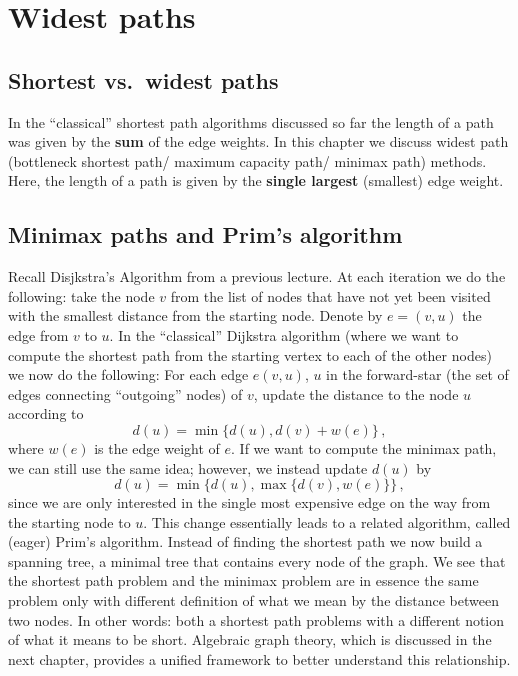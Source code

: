 \chapter{Widest paths}%
\label{chap:08}

\setcounter{section}{1}
\section{Shortest vs.\ widest paths}
In the ``classical'' shortest path algorithms discussed so far the
length of a path was given by the \textbf{sum} of the edge weights. In
this chapter we discuss widest path (bottleneck shortest path/ maximum
capacity path/ minimax path) methods.  Here, the length of a path is
given by the \textbf{single largest} (smallest) edge weight.

\section{Minimax paths and Prim's algorithm}
Recall Disjkstra's Algorithm from a previous lecture. At each
iteration we do the following: take the node $v$ from the list of
nodes that have not yet been visited with the smallest distance from
the starting node. Denote by $e = (v,u)$ the edge from $v$ to $u$.  In
the ``classical'' Dijkstra algorithm (where we want to compute the
shortest path from the starting vertex to each of the other nodes) we
now do the following: For each edge $e(v,u)$, $u$ in the forward-star
(\ie the set of edges connecting ``outgoing'' nodes) of $v$, update
the distance to the node $u$ according to
\begin{equation*}
  d(u) = \min\{d(u), d(v) + w(e) \}\,,
\end{equation*}
where $w(e)$ is the edge weight of $e$. If we want to compute the
minimax path, we can still use the same idea; however, we instead
update $d(u)$ by
\begin{equation*}
  d(u) = \min\{d(u), \max\{ d(v), w(e) \}\}\,,
\end{equation*}
since we are only interested in the single most expensive edge on the
way from the starting node to $u$. This change essentially leads to a
related algorithm, called (eager) Prim's algorithm. Instead of finding
the shortest path we now build a spanning tree, \ie a minimal tree
that contains every node of the graph. We see that the shortest path
problem and the minimax problem are in essence the same problem only
with different definition of what we mean by the distance between two
nodes. In other words: both a shortest path problems with a different
notion of what it means to be short. Algebraic graph theory, which is
discussed in the next chapter, provides a unified framework to better
understand this relationship.

